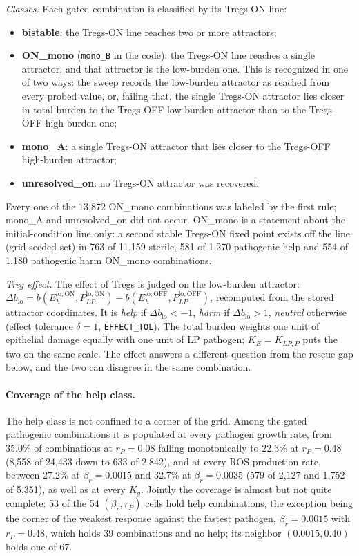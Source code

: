 \documentclass[11pt]{article}
\begin{document}
\emph{Classes.} Each gated combination is classified by its Tregs-ON line:
\begin{itemize}
\item \textbf{bistable}: the Tregs-ON line reaches two or more attractors;
\item \textbf{ON\_mono} (\texttt{mono\_B} in the code): the Tregs-ON line reaches a
  single attractor, and that attractor is the low-burden one. This is recognized in one
  of two ways: the sweep records the low-burden attractor as reached from every probed
  value, or, failing that, the single Tregs-ON attractor lies closer in total burden to the
  Tregs-OFF low-burden attractor than to the Tregs-OFF high-burden one;
\item \textbf{mono\_A}: a single Tregs-ON attractor that lies closer to the Tregs-OFF
  high-burden attractor;
\item \textbf{unresolved\_on}: no Tregs-ON attractor was recovered.
\end{itemize}
Every one of the 13,872 ON\_mono combinations was labeled by the first rule; mono\_A
and unresolved\_on did not occur. ON\_mono is a statement about the initial-condition
line only: a second stable Tregs-ON fixed point exists off the line (grid-seeded set)
in 763 of 11,159 sterile, 581 of 1,270 pathogenic help and 554 of 1,180 pathogenic harm
ON\_mono combinations.

\emph{Treg effect.} The effect of Tregs is judged on the low-burden attractor:
$\Delta b_{\mathrm{lo}} = b(E_h^{\mathrm{lo,ON}}, P_{LP}^{\mathrm{lo,ON}}) -
b(E_h^{\mathrm{lo,OFF}}, P_{LP}^{\mathrm{lo,OFF}})$, recomputed from the stored attractor
coordinates. It is \emph{help} if $\Delta b_{\mathrm{lo}} < -1$, \emph{harm} if
$\Delta b_{\mathrm{lo}} > 1$, \emph{neutral} otherwise (effect tolerance $\delta = 1$,
\texttt{EFFECT\_TOL}). The
total burden weights one unit of epithelial damage equally with one unit of LP pathogen;
$K_E = K_{LP,P}$ puts the two on the same scale. The effect answers a different question
from the rescue gap below, and the two can disagree in the same combination.

\paragraph{Coverage of the help class.} The help class is not confined to a corner of the
grid. Among the gated pathogenic combinations it is populated at every pathogen growth rate,
from 35.0\% of combinations at $r_P = 0.08$ falling monotonically to 22.3\% at $r_P = 0.48$
(8{,}558 of 24{,}433 down to 633 of 2{,}842), and at every ROS production rate, between 27.2\%
at $\beta_r = 0.0015$ and 32.7\% at $\beta_r = 0.0035$ (579 of 2{,}127 and 1{,}752 of 5{,}351),
as well as at every $K_g$. Jointly the coverage is almost but not quite complete: 53 of the 54
$(\beta_r, r_P)$ cells hold help combinations, the exception being the corner of the weakest
response against the fastest pathogen, $\beta_r = 0.0015$ with $r_P = 0.48$, which holds 39
combinations and no help; its neighbor $(0.0015, 0.40)$ holds one of 67.
\end{document}
